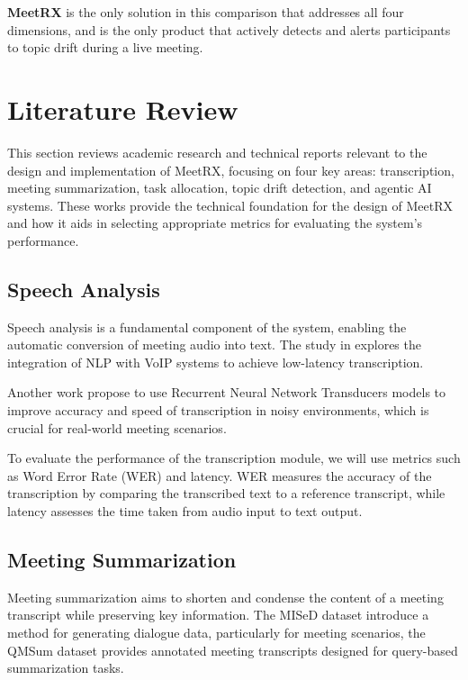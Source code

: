 \textbf{MeetRX} is the only solution in this comparison that addresses all four dimensions, and is the
only product that actively detects and alerts participants to topic drift during a live meeting.

\section{Literature Review}
\label{section:literature-review}

This section reviews academic research and technical reports relevant to the design and implementation of MeetRX, focusing on four key areas: transcription, meeting summarization, task allocation, topic drift detection, and agentic AI systems. These works provide the technical foundation for the design of MeetRX and how it aids in selecting appropriate metrics for evaluating the system's performance.

\subsection{Speech Analysis}
\label{subsection:speech-analysis}

Speech analysis is a fundamental component of the system, enabling the automatic conversion of meeting audio into text. The study in\cite{transcription_voip_11159004} explores the integration of NLP with VoIP systems to achieve low-latency transcription.

Another work\cite{rnnt_transcription_10257856} propose to use Recurrent Neural Network Transducers models to improve accuracy and speed of transcription in noisy environments, which is crucial for real-world meeting scenarios.

To evaluate the performance of the transcription module, we will use metrics such as Word Error Rate (WER)\cite{wer_eval} and latency. WER measures the accuracy of the transcription by comparing the transcribed text to a reference transcript, while latency assesses the time taken from audio input to text output.

\subsection{Meeting Summarization}
\label{subsection:meeting-summarization}

Meeting summarization aims to shorten and condense the content of a meeting transcript while preserving key information. The MISeD dataset\cite{mised_paper} introduce a method for generating dialogue data, particularly for meeting scenarios, the QMSum dataset\cite{qmsum_dataset} provides annotated meeting transcripts designed for query-based summarization tasks.

